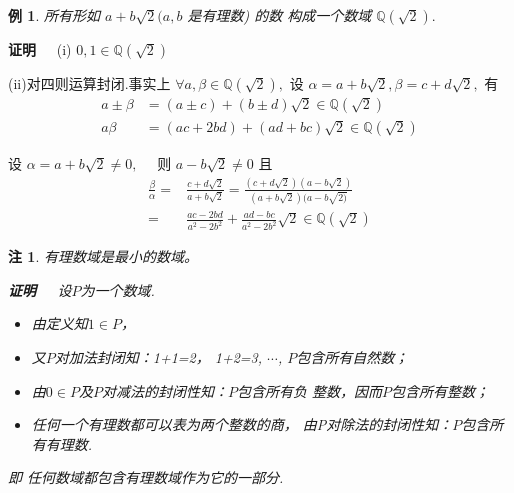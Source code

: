 \documentclass[13pt,fontset=mac]{ctexbeamer}
\newtheorem{exa}{例}
\newtheorem*{rem}{注}
\def\pf{{\bf 证明~~ }}
\def\a{\alpha}
\begin{document}
\begin{frame}
\begin{exa}
所有形如 $a+b \sqrt{2}(a ,b$ 是有理数) 的数 构成一个数域 $\mathbb{Q}(\sqrt{2}) .$
\end{exa} 

\pause
\pf (i) $0,1 \in \mathbb{Q}(\sqrt{2})$


(ii)对四则运算封闭.事实上 $\forall a, \beta \in \mathbb{Q}(\sqrt{2}),$ 设 $\a=a+b \sqrt{2}, \beta=c+d \sqrt{2},$ 有
\begin{align*}
a \pm \beta & =(a \pm c)+(b \pm d) \sqrt{2} \in \mathbb{Q}(\sqrt{2})\\[6pt]
a \beta & =(a c+2 b d)+(a d+b c) \sqrt{2} \in \mathbb{Q}(\sqrt{2})
\end{align*}

设 $\a=a+b \sqrt{2} \neq 0, \quad$ 则 $a-b \sqrt{2} \neq 0$ 且
\begin{align*}
\frac{\beta}{\a}= & \frac{c+d \sqrt{2}}{a+b \sqrt{2}}=\frac{(c+d \sqrt{2})(a-b \sqrt{2})}{(a+b \sqrt{2})(a-b \sqrt{2)}}\\[6pt]
= & \frac{a c-2 b d}{a^{2}-2 b^{2}}+\frac{a d-b c}{a^{2}-2 b^{2}} \sqrt{2} \in \mathbb{Q}(\sqrt{2})
\end{align*}

\end{frame}

\begin{frame}
\begin{rem}
有理数域是最小的数域。


\pf
设$P$为一个数域.
\begin{itemize}
    \item 由定义知$1\in P$，
    \item 又$P$对加法封闭知：1+1=2，
1+2=3, $\cdots$,  $P$包含所有\alert{自然数}；
	\item 由$0\in P$及$P$对减法的封闭性知：$P$包含所有负
整数，因而$P$包含所有\alert{整数}；
\item 
任何一个有理数都可以表为两个整数的商，
由P对除法的封闭性知：$P$包含所有\alert{有理数}.

\end{itemize}

即
    任何数域都包含有理数域作为它的一部分.

\end{rem}

\end{frame}
\end{document}
